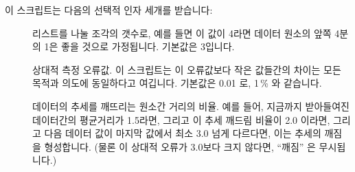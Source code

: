 이 스크립트는 다음의 선택적 인자 세개를 받습니다:

\begin{description}
\item	[\nf{:}] 리스트를 나눌 조각의 갯수로, 예를 들면 이 값이
	4라면 데이터 원소의 앞쪽 4분의 1은 좋을 것으로 가정됩니다.
	기본값은 3입니다.
\item	[\nf{:}] 상대적 측정 오류값.  이 스크립트는 이 오류값보다
	작은 값들간의 차이는 모든 목적과 의도에 동일하다고 여깁니다.
	기본값은 0.01 로, 1\,\% 와 같습니다.
\item	[\nf{:}] 데이터의 추세를 깨뜨리는 원소간 거리의 비율.
	예를 들어, 지금까지 받아들여진 데이터간의 평균거리가 1.5라면, 그리고 이
	추세 깨드림 비율이 2.0 이라면, 그리고 다음 데이터 값이 마지막 값에서
	최소 3.0 넘게 다르다면, 이는 추세의 깨짐을 형성합니다.
	(물론 이 상대적 오류가 3.0보다 크지 않다면, ``깨짐'' 은 무시됩니다.)

\end{description}

